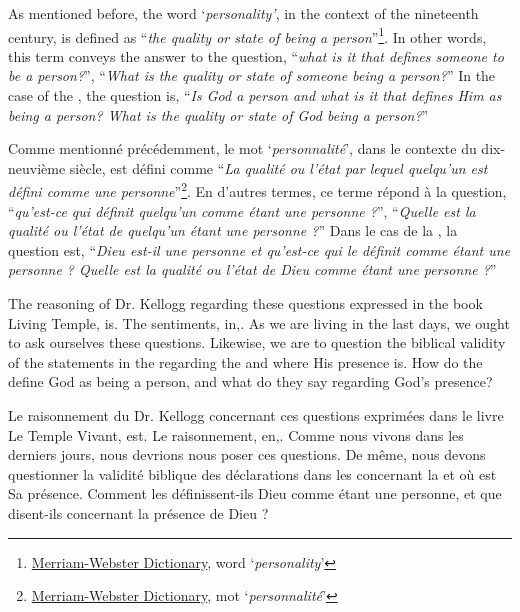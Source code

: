As mentioned before, the word ‘\textit{personality’}, in the context of the nineteenth century, is defined as “\textit{the quality or state of being a person}”\footnote{\href{https://www.merriam-webster.com/dictionary/personality}{Merriam-Webster Dictionary}, word ‘\textit{personality}’}. In other words, this term conveys the answer to the question, “\textit{what is it that defines someone to be a person?}”, “\textit{What is the quality or state of someone being a person?}” In the case of the , the question is, “\textit{Is God a person and what is it that defines Him as being a person? What is the quality or state of God being a person?}”


Comme mentionné précédemment, le mot ‘\textit{personnalité}’, dans le contexte du dix-neuvième siècle, est défini comme “\textit{La qualité ou l'état par lequel quelqu'un est défini comme une personne}”\footnote{\href{https://www.merriam-webster.com/dictionary/personality}{Merriam-Webster Dictionary}, mot ‘\textit{personnalité}’}. En d'autres termes, ce terme répond à la question, “\textit{qu'est-ce qui définit quelqu'un comme étant une personne ?}”, “\textit{Quelle est la qualité ou l'état de quelqu'un étant une personne ?}” Dans le cas de la , la question est, “\textit{Dieu est-il une personne et qu'est-ce qui le définit comme étant une personne ? Quelle est la qualité ou l'état de Dieu comme étant une personne ?}”


The reasoning of Dr. Kellogg regarding these questions expressed in the book Living Temple, is. The sentiments, in,. As we are living in the last days, we ought to ask ourselves these questions. Likewise, we are to question the biblical validity of the statements in the  regarding the  and where His presence is. How do the  define God as being a person, and what do they say regarding God’s presence?


Le raisonnement du Dr. Kellogg concernant ces questions exprimées dans le livre Le Temple Vivant, est. Le raisonnement, en,. Comme nous vivons dans les derniers jours, nous devrions nous poser ces questions. De même, nous devons questionner la validité biblique des déclarations dans les  concernant la  et où est Sa présence. Comment les  définissent-ils Dieu comme étant une personne, et que disent-ils concernant la présence de Dieu ?


